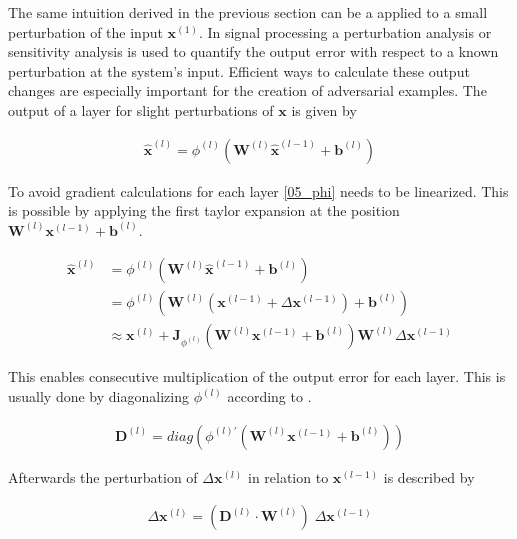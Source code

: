 \begingroup
The same intuition derived in the previous section can be a applied to a small perturbation of the input $\bm{x}^{(1)}$.
In signal processing a perturbation analysis or sensitivity analysis is used to quantify the output error with respect to a known perturbation at the system's input.
Efficient ways to calculate these output changes are especially important for the creation of adversarial examples.
The output of a layer for slight perturbations of $\bm{x}$ is given by
\endgroup

\begin{equation}
\label{05_phi}
\begin{aligned}
  \bm{\hat{x}}^{(l)} = \phi^{(l)} (\bm{W}^{(l)} \bm{\hat{x}}^{(l-1)} + \bm{b}^{(l)})
\end{aligned}
\end{equation}

\begingroup
To avoid gradient calculations for each layer \ref{05_phi} needs to be linearized. This is possible by applying
the first taylor expansion at the position $\bm{W}^{(l)} \bm{x}^{(l-1)} + \bm{b}^{(l)}$.
\endgroup

\begin{equation}
\label{05_error}
\begin{aligned}
  \bm{\hat{x}}^{(l)} &= \phi^{(l)} (\bm{W}^{(l)} \bm{\hat{x}}^{(l-1)} + \bm{b}^{(l)}) \\
   &= \phi^{(l)} (\bm{W}^{(l)} (\bm{x}^{(l-1)} + \Delta \bm{x}^{(l-1)} ) + \bm{b}^{(l)}) \\
   &\approx \bm{x}^{(l)} + \bm{J}_{\phi^{(l)}} (\bm{W}^{(l)} \bm{x}^{(l-1)} + \bm{b}^{(l)}) \bm{W}^{(l)} \Delta \bm{x}^{(l-1)}
\end{aligned}
\end{equation}

\begingroup
This enables consecutive multiplication of the output error for each layer. This is
usually done by diagonalizing $\phi^{(l)}$ according to \cite{NeuralError}.
\endgroup

\begin{equation}
\label{05_diagonal}
\begin{aligned}
  \bm{D}^{(l)} = diag( \phi^{(l)'} (\bm{W}^{(l)} \bm{x}^{(l-1)} + \bm{b}^{(l)}) )
\end{aligned}
\end{equation}

\begingroup
Afterwards the perturbation of $\Delta \bm{x}^{(l)}$ in relation to $\bm{x}^{(l-1)}$ is
described by
\endgroup

\begin{equation}
\label{05_output}
\begin{aligned}
  \Delta \bm{x}^{(l)} = (\bm{D}^{(l)} \cdot \bm{W}^{(l)}) \; \Delta \bm{x}^{(l-1)}
\end{aligned}
\end{equation}

